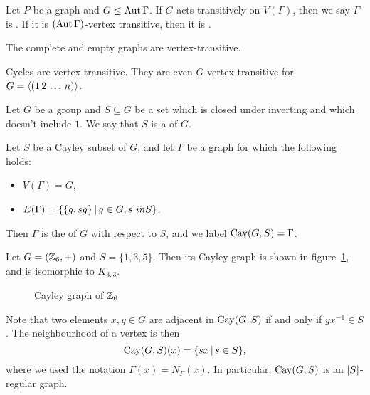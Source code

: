 
\begin{definition}
  Let $P$ be a graph and $G \le \operatorname{Aut} \Gamma$.
  If $G$ acts transitively on $V(\Gamma)$, then we say $\Gamma$ is
  .
  If it is $(\operatorname{Aut} \Gamma)$-vertex transitive, then it is
  .
\end{definition}

\begin{example}
  The complete and empty graphs are vertex-transitive.
\end{example}

\begin{example}
  Cycles are vertex-transitive.
  They are even $G$-vertex-transitive for $G = \left< (1\,2\,\ldots\,n) \right>$.
\end{example}


Let $G$ be a group and $S \subseteq G$ be a set which is closed under inverting
and which doesn't include $1$.
We say that $S$ is a  of $G$.

\begin{definition}
  Let $S$ be a Cayley subset of $G$, and let $\Gamma$ be a graph for which the
  following holds:
  \begin{itemize}
  \item $V(\Gamma) = G$,
  \item $E(\Gamma) = \{ \{g, sg\} \,|\, g \in G, s \ in S \}$.
  \end{itemize}
  Then $\Gamma$ is the  of $G$ with respect to $S$, and we
  label $\operatorname{Cay}(G, S) = \Gamma$.
\end{definition}

\begin{example}
  Let $G = (\mathbb{Z}_6, +)$ and $S = \{1, 3, 5\}$.
  Then its Cayley graph is shown in figure~\ref{fig:sg-03-cayley-z6}, and is
  isomorphic to $K_{3,3}$.
\end{example}

\begin{figure}[ht!]
  \centering
  \caption{Cayley graph of $\mathbb{Z}_6$}%
  \label{fig:sg-03-cayley-z6}
\end{figure}

Note that two elements $x, y \in G$ are adjacent in $\operatorname{Cay}(G,S)$ if and only if
$yx^{-1} \in S$.
The neighbourhood of a vertex is then
\[
  \operatorname{Cay}(G,S)(x) = \{ sx \,|\, s \in S \},
\]
where we used the notation $\Gamma(x) = N_\Gamma(x)$.
In particular, $\operatorname{Cay}(G,S)$ is an $\left| S \right|$-regular graph.

